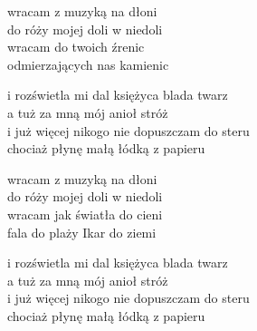 \begin{text}
    wracam z muzyką na dłoni\\
    do róży mojej doli w niedoli\\
    wracam do twoich źrenic\\
    odmierzających nas kamienic

    i rozświetla mi dal księżyca blada twarz\\
    a tuż za mną mój anioł stróż\\
    i już więcej nikogo nie dopuszczam do steru\\
    chociaż płynę małą łódką z papieru

    wracam z muzyką na dłoni\\
    do róży mojej doli w niedoli\\
    wracam jak światła do cieni\\
    fala do plaży Ikar do ziemi

    i rozświetla mi dal księżyca blada twarz\\
    a tuż za mną mój anioł stróż\\
    i już więcej nikogo nie dopuszczam do steru\\
    chociaż płynę małą łódką z papieru
\end{text}
\begin{chord}

\end{chord}